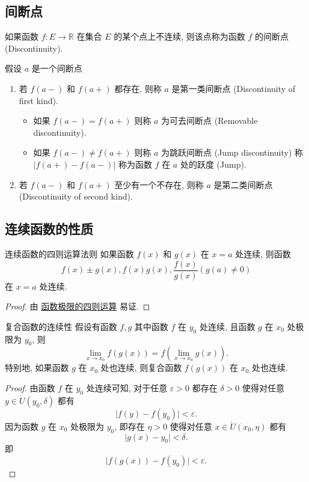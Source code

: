 \documentclass[cn,toc=twocol]{elegantbook}
\newcommand{\ITEMS}{\begin{enumerate}}
\newcommand{\ITEME}{\end{enumerate}}
\newcommand{\R}{\mathbb{R}}
\begin{document}

\subsection{间断点}
\begin{definition}
如果函数 $f: E \to \R$ 在集合 $E$ 的某个点上不连续, 则该点称为函数 $f$ 的间断点 (Discontinuity).
\smallskip

假设 $a$ 是一个间断点
\ITEMS
\item 若 $f(a−)$ 和 $f(a+)$ 都存在, 则称 $a$ 是第一类间断点 (Discontinuity of first kind). 
\begin{itemize}
	\item 如果 $f(a−) = f(a+)$ 则称 $a$ 为可去间断点 (Removable discontinuity).
	\item 如果 $f(a−) \neq f(a+)$ 则称 $a$ 为跳跃间断点 (Jump discontinuity) 称 $\lvert f(a+)−
f(a−)\rvert$ 称为函数 $f$ 在 $a$ 处的跃度 (Jump).
\end{itemize}
\smallskip

\item 若 $f(a−)$ 和 $f(a+)$ 至少有一个不存在, 则称 $a$ 是第二类间断点 (Discontinuity of second kind).
\ITEME
\end{definition}

\subsection{连续函数的性质}

\begin{theorem}{连续函数的四则运算法则}
如果函数 $f(x)$ 和 $g(x)$ 在 $x = a$ 处连续, 则函数
\[
	f(x) \pm g(x), f(x)g(x) , \frac{f(x)}{g(x)} (g(a) \neq 0)
\]	
在 $x = a$ 处连续.
\end{theorem}
\begin{proof}
由 \hyperref[thm:Flimit_p6]{函数极限的四则运算} 易证.	
\end{proof}

\vspace{0.5em}

\begin{theorem}{复合函数的连续性}
	假设有函数 $f,g$ 其中函数 $f$ 在 $y_0$ 处连续, 且函数 $g$ 在 $x_0$ 处极限为 $y_0$, 则
	\[
		\lim_{x \to x_0} f(g(x)) = f\left(\lim_{x \to x_0} g(x)\right).
	\]
	特别地, 如果函数 $g$ 在 $x_0$ 处也连续, 则复合函数 $f(g(x))$ 在 $x_0$ 处也连续.
\end{theorem}
\begin{proof}
	由函数 $f$ 在 $y_0$ 处连续可知, 对于任意 $\varepsilon > 0$ 都存在 $\delta > 0$ 使得对任意 $y \in \mathring{U}(y_0,\delta)$ 都有
	\[
		\lvert f(y) - f(y_0) \rvert < \varepsilon.
	\]
	因为函数 $g$ 在 $x_0$ 处极限为 $y_0$, 即存在 $\eta > 0$ 使得对任意 $x \in \mathring{U}(x_0,\eta)$ 都有
	\[
		\lvert g(x) - y_0 \rvert < \delta.
	\]
	即
	\[
		\lvert f(g(x)) - f(y_0) \rvert < \varepsilon.
	\]
\end{proof}
\end{document}
